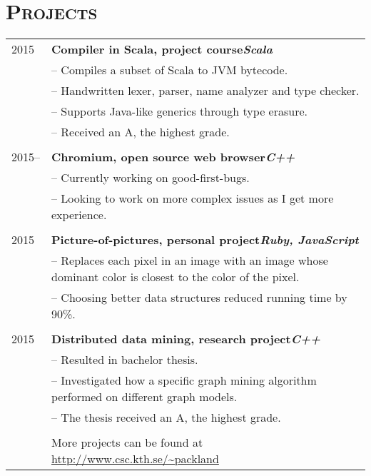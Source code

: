 \documentclass[10.5pt]{article}
\newenvironment{sect}[1][]
{ \section*{\textsc{#1}} \noindent \begin{tabular}{p{5.3em} p{48em}} }
{ \end{tabular} }
\begin{document}
\begin{sect}[Projects]
  2015&\textbf{Compiler in Scala, project course\hfill \textit{Scala}} \\
  &-- Compiles a subset of Scala to JVM bytecode.\\
  &-- Handwritten lexer, parser, name analyzer and type checker.\\
  &-- Supports Java-like generics through type erasure.\\
  &-- Received an A, the highest grade.\\ \\

  2015--&\textbf{Chromium, open source web browser\hfill \textit{C++}} \\
  &-- Currently working on good-first-bugs. \\
  &-- Looking to work on more complex issues as I get more experience.\\ \\

  2015&\textbf{Picture-of-pictures, personal project\hfill \textit{Ruby, JavaScript}} \\
  &-- Replaces each pixel in an image with an image whose dominant color is closest to the color of the pixel.\\
  &-- Choosing better data structures reduced running time by 90\%. \\ \\

  2015&\textbf{Distributed data mining, research project\hfill \textit{C++}} \\
  &-- Resulted in bachelor thesis.\\
  &-- Investigated how a specific graph mining algorithm performed on different graph models.\\
  &-- The thesis received an A, the highest grade. \\ \\
  &More projects can be found at \url{http://www.csc.kth.se/~packland} \\
\end{sect}
\end{document}
